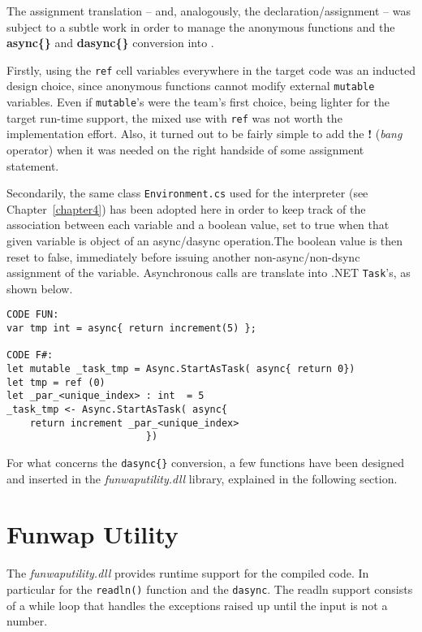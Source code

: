 The assignment translation -- and, analogously, the declaration/assignment -- was subject to a subtle work in order to manage the anonymous functions and the \textbf{async\{\}} and \textbf{dasync\{\}} conversion into \fsharp. 

Firstly, using the \texttt{ref} cell variables everywhere in the target code was an inducted design choice, since \fsharp anonymous functions cannot modify external \texttt{mutable} variables. Even if \texttt{mutable}'s were the team's first choice, being lighter for the target run-time support, the mixed use with \texttt{ref} was not worth the implementation effort. Also, it turned out to be fairly simple to add the \textbf{!} (\textit{bang} operator) when it was needed on the right handside of some assignment statement.

Secondarily, the same class \texttt{Environment.cs} used for the interpreter (see Chapter~\ref{chapter4}) has been adopted here in order to keep track of the association between each variable and a boolean value, set to true when that given variable is object of an async/dasync operation.The boolean value is then reset to false, immediately before issuing another non-async/non-dsync assignment of the variable. Asynchronous calls are translate into .NET \texttt{Task}'s, as shown below.

\begin{lstlisting}[caption=Example of \texttt{async\{\}} block translation.]
CODE FUN:
var tmp int = async{ return increment(5) };

CODE F#:
let mutable _task_tmp = Async.StartAsTask( async{ return 0})
let tmp = ref (0)
let _par_<unique_index> : int  = 5
_task_tmp <- Async.StartAsTask( async{
	return increment _par_<unique_index>
						})
\end{lstlisting}

For what concerns the \texttt{dasync\{\}} conversion, a few functions have been designed and inserted in the \textit{funwaputility.dll} library, explained in the following section.

\section{Funwap Utility}
The \textit{funwaputility.dll} provides \fsharp runtime support for the compiled code. In particular for the \texttt{readln()} function and the \texttt{dasync{}}. The readln support consists of a while loop that handles the exceptions raised up until the input is not a number.\\

